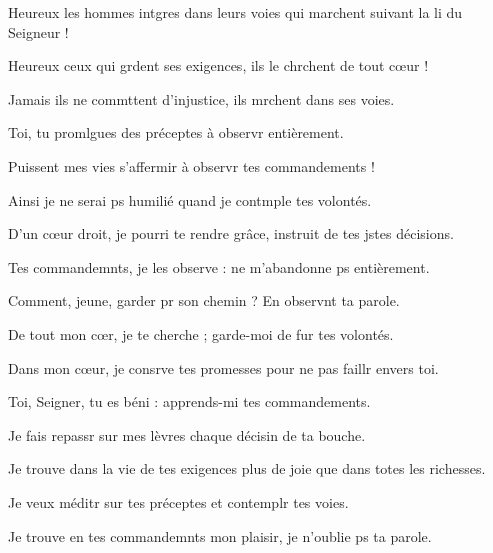 \item Heureux les hommes intgres dans leurs voies\psstar{} qui marchent suivant la li du Seigneur !
\item Heureux ceux qui grdent ses exigences,\psstar{} ils le chrchent de tout cœur !
\item Jamais ils ne commttent d’injustice,\psstar{} ils mrchent dans ses voies.
\item Toi, tu promlgues des préceptes\psstar{} à observr entièrement.
\item Puissent mes vies s’affermir\psstar{} à observr tes commandements !
\item Ainsi je ne serai ps humilié\psstar{} quand je contmple tes volontés.
\item D’un cœur droit, je pourri te rendre grâce,\psstar{} instruit de tes jstes décisions.
\item Tes commandemnts, je les observe :\psstar{} ne m’abandonne ps entièrement.
\item Comment, jeune, garder pr son chemin ?\psstar{} En observnt ta parole.
\item De tout mon cœr, je te cherche ;\psstar{} garde-moi de fur tes volontés.
\item Dans mon cœur, je consrve tes promesses\psstar{} pour ne pas faillr envers toi.
\item Toi, Seigner, tu es béni :\psstar{} apprends-mi tes commandements.
\item Je fais repassr sur mes lèvres\psstar{} chaque décisin de ta bouche.
\item Je trouve dans la vie de tes exigences\psstar{} plus de joie que dans totes les richesses.
\item Je veux méditr sur tes préceptes\psstar{} et contemplr tes voies.
\item Je trouve en tes commandemnts mon plaisir,\psstar{} je n’oublie ps ta parole.